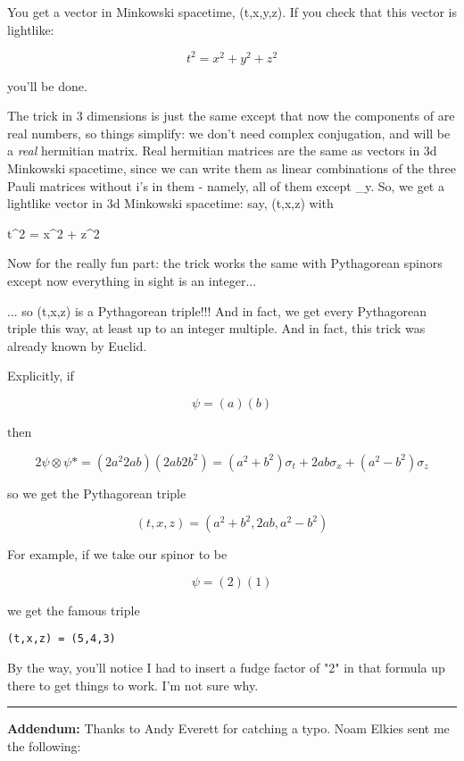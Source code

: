 You get a vector in Minkowski spacetime, (t,x,y,z).   
If you check that this vector is lightlike:

$$
t^{2} = x^{2} + y^{2} + z^{2} 
$$
    
you'll be done.

The trick in 3 dimensions is just the same except that now
the components of \psi  are real numbers, so things simplify:
we don't need complex conjugation, and \psi  \otimes  \psi * 
will be a \emph{real} hermitian matrix.  Real hermitian matrices
are the same as vectors in 3d Minkowski spacetime, since we 
can write them as linear combinations of the three Pauli 
matrices without i's in them - namely, all of them except
\sigma _{y}.  So, we get a lightlike vector in 3d Minkowski 
spacetime: say, (t,x,z) with 

t^{2} = x^{2} + z^{2} 

Now for the really fun part: the trick works the same with 
Pythagorean spinors except now everything in sight is an integer... 

... so (t,x,z) is a Pythagorean triple!!!   And in fact,
we get every Pythagorean triple this way, at least up to
an integer multiple.  And in fact, this trick was already 
known by Euclid.  

Explicitly, if 

$$
\psi  = (a)
    (b)
$$
    
then 

$$
2 \psi  \otimes  \psi * = (2a^{2}  2ab) 
           (2ab  2b^{2})                  

         = (a^{2} + b^{2}) \sigma _{t} + 2ab \sigma _{x}  + (a^{2} - b^{2}) \sigma _{z}
$$
    
so we get the Pythagorean triple

$$
(t,x,z) = (a^{2} + b^{2}, 2ab, a^{2} - b^{2})
$$
    
For example, if we take our spinor to be

$$
\psi  = (2)
    (1)
$$
    
we get the famous triple 

\begin{verbatim}
(t,x,z) = (5,4,3)  
\end{verbatim}
    

By the way, you'll notice I had to insert a fudge factor of
"2" in that formula up there to get things to work.  I'm not
sure why.

\par\noindent\rule{\textwidth}{0.4pt}
\textbf{Addendum:} Thanks to Andy Everett for catching a typo.
Noam Elkies sent me the following:



